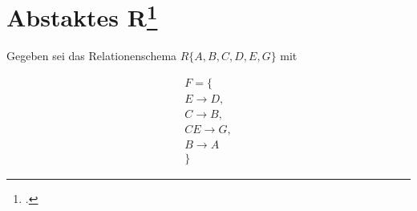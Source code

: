 \documentclass{lehramt-informatik}
\begin{document}
%

\section{Abstaktes R\footcite[Seite 1, Aufgabe 1]{db:ab:6}}

Gegeben sei das Relationenschema $R\{A, B, C, D, E, G\}$ mit

\begin{multline}
F = \{ \\
  E \rightarrow D, \\
  C \rightarrow B, \\
  CE \rightarrow G, \\
  B \rightarrow A \\
\}
\end{multline}
\end{document}
